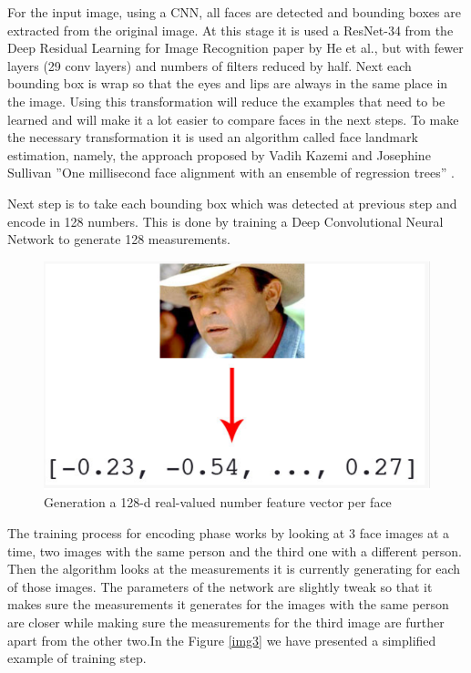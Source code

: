 \documentclass[runningheads,a4paper,11pt]{report}
\begin{document}
    For the input image, using a CNN, all faces are detected and bounding boxes are extracted from the original image. At this stage it is used a ResNet-34 from the Deep Residual Learning for Image Recognition \cite{he2016deep} paper by He et al., but with fewer layers (29 conv layers) and numbers of filters reduced by half. Next each bounding box is wrap so that the eyes and lips are always in the same place in the image. Using this transformation will reduce the examples that need to be learned and will make it a lot easier to compare faces in the next steps.
    To make the necessary transformation it is used an algorithm called face landmark estimation, namely, the approach proposed by Vadih Kazemi and Josephine Sullivan ''One millisecond face alignment with an ensemble of regression trees'' \cite{kazemi2014one}.

    Next step is to take each bounding box which was detected at previous step and encode in 128 numbers. This is done by training a Deep Convolutional Neural Network to generate 128 measurements.

    \begin{figure}[!htb]
        \centering
        \includegraphics[scale=0.6]{Figures/img4.png}
        \caption{ Generation a 128-d real-valued number feature vector per face \cite{binotuopencv}}
        \label{img4}
    \end{figure}

    The training process for encoding phase works by looking at 3 face images at a time, two images with the same person and the third one with a different person. Then the algorithm looks at the measurements it is currently generating for each of those images. The parameters of the network are slightly tweak so that it makes sure the measurements it generates for the images with the same person are closer while making sure the measurements for the third image are further apart from the other two.In the Figure \ref{img3} we have presented a simplified example of training step.
\end{document}
